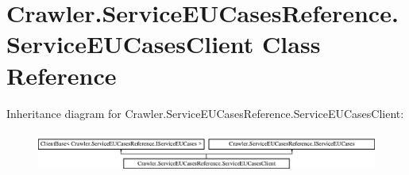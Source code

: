 \hypertarget{class_crawler_1_1_service_e_u_cases_reference_1_1_service_e_u_cases_client}{\section{Crawler.\-Service\-E\-U\-Cases\-Reference.\-Service\-E\-U\-Cases\-Client Class Reference}
\label{class_crawler_1_1_service_e_u_cases_reference_1_1_service_e_u_cases_client}
}
Inheritance diagram for Crawler.\-Service\-E\-U\-Cases\-Reference.\-Service\-E\-U\-Cases\-Client\-:\begin{figure}[H]
\begin{center}
\leavevmode
\includegraphics[height=1.369193cm]{class_crawler_1_1_service_e_u_cases_reference_1_1_service_e_u_cases_client}
\end{center}
\end{figure}
